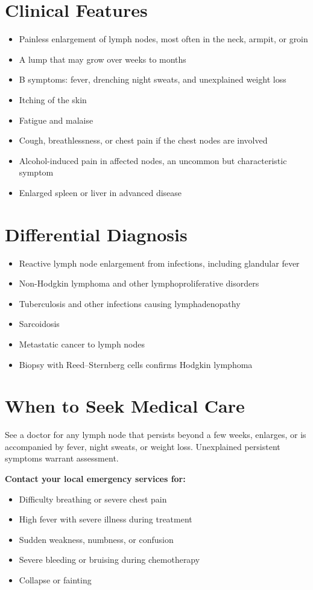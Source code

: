 \section*{Clinical Features}
\begin{itemize}
    \item Painless enlargement of lymph nodes, most often in the neck, armpit, or groin
    \item A lump that may grow over weeks to months
    \item B symptoms: fever, drenching night sweats, and unexplained weight loss
    \item Itching of the skin
    \item Fatigue and malaise
    \item Cough, breathlessness, or chest pain if the chest nodes are involved
    \item Alcohol-induced pain in affected nodes, an uncommon but characteristic symptom
    \item Enlarged spleen or liver in advanced disease
\end{itemize}

\section*{Differential Diagnosis}
\begin{itemize}
    \item Reactive lymph node enlargement from infections, including glandular fever
    \item Non-Hodgkin lymphoma and other lymphoproliferative disorders
    \item Tuberculosis and other infections causing lymphadenopathy
    \item Sarcoidosis
    \item Metastatic cancer to lymph nodes
    \item Biopsy with Reed--Sternberg cells confirms Hodgkin lymphoma
\end{itemize}

\section*{When to Seek Medical Care}
See a doctor for any lymph node that persists beyond a few weeks, enlarges, or is accompanied by fever, night sweats, or weight loss. Unexplained persistent symptoms warrant assessment.

\textbf{Contact your local emergency services for:}
\begin{itemize}
    \item Difficulty breathing or severe chest pain
    \item High fever with severe illness during treatment
    \item Sudden weakness, numbness, or confusion
    \item Severe bleeding or bruising during chemotherapy
    \item Collapse or fainting
\end{itemize}

